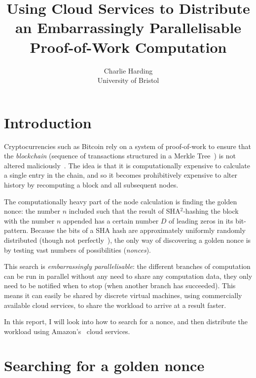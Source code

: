 \documentclass[letterpaper,twocolumn,11pt]{article}
\begin{document}
\title{Using Cloud Services to Distribute an Embarrassingly Parallelisable Proof-of-Work Computation}

\author{
{\rm Charlie Harding}\\
University of Bristol\\
} %

\maketitle

\tableofcontents

\section{Introduction}

Cryptocurrencies such as Bitcoin rely on a system of proof-of-work to ensure that the \textit{blockchain} (sequence of transactions structured in a Merkle Tree~\cite{blockonomi_2018}) is not altered maliciously~\cite{bitcoin}. The idea is that it is computationally expensive to calculate a single entry in the chain, and so it becomes prohibitively expensive to alter history by recomputing a block and all subsequent nodes.

The computationally heavy part of the node calculation is finding the golden nonce: the number $n$ included such that the result of SHA$^2$-hashing the block with the number $n$ appended has a certain number $D$ of leading zeros in its bit-pattern. Because the bits of a SHA hash are approximately uniformly randomly distributed (though not perfectly~\cite{cryptoeprint:2008:441}), the only way of discovering a golden nonce is by testing vast numbers of possibilities (\textit{nonces}).

This search is \textit{embarrassingly parallelisable}: the different branches of computation can be run in parallel without any need to share any computation data, they only need to be notified when to stop (when another branch has succeeded). This means it can easily be shared by discrete virtual machines, using commercially available cloud services, to share the workload to arrive at a result faster.

In this report, I will look into how to search for a nonce, and then distribute the workload using Amazon's~\cite{aws} cloud services.

\section{Searching for a golden nonce}
\end{document}
